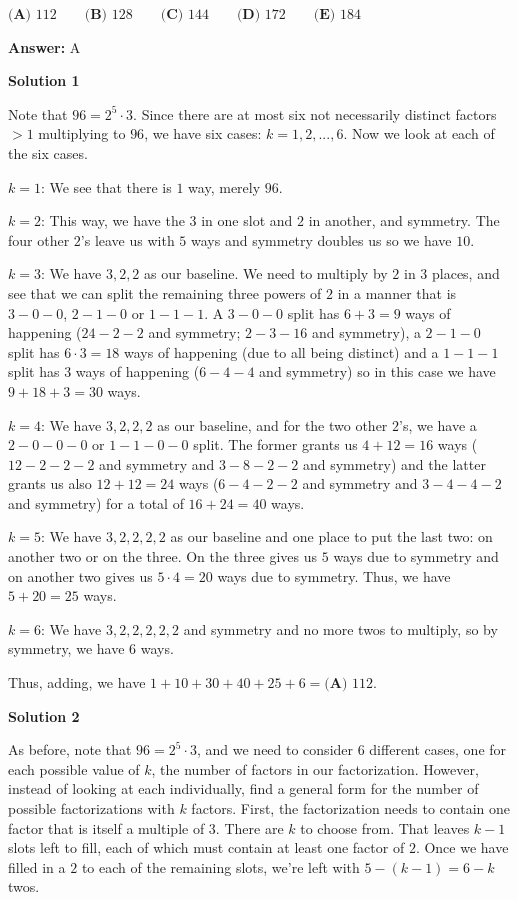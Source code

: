 \begin{enumerate}
 $\textbf{(A) } 112 \qquad\textbf{(B) } 128 \qquad\textbf{(C) } 144 \qquad\textbf{(D) } 172 \qquad\textbf{(E) } 184$

 \textbf{Answer: }A



\textbf{Solution 1}

Note that $96 = 2^5 \cdot 3$. Since there are at most six not necessarily distinct factors $>1$ multiplying to $96$, we have six cases: $k=1, 2, ..., 6.$ Now we look at each of the six cases.

 
$k=1$: We see that there is $1$ way, merely $96$.

 $k=2$: This way, we have the $3$ in one slot and $2$ in another, and symmetry. The four other $2$'s leave us with $5$ ways and symmetry doubles us so we have $10$.

 $k=3$: We have $3, 2, 2$ as our baseline. We need to multiply by $2$ in $3$ places, and see that we can split the remaining three powers of $2$ in a manner that is $3-0-0$, $2-1-0$ or $1-1-1$. A $3-0-0$ split has $6 + 3 = 9$ ways of happening ($24-2-2$ and symmetry; $2-3-16$ and symmetry), a $2-1-0$ split has $6 \cdot 3 = 18$ ways of happening (due to all being distinct) and a $1-1-1$ split has $3$ ways of happening ($6-4-4$ and symmetry) so in this case we have $9+18+3=30$ ways.

 $k=4$: We have $3, 2, 2, 2$ as our baseline, and for the two other $2$'s, we have a $2-0-0-0$ or $1-1-0-0$ split. The former grants us $4+12=16$ ways ($12-2-2-2$ and symmetry and $3-8-2-2$ and symmetry) and the latter grants us also $12+12=24$ ways ($6-4-2-2$ and symmetry and $3-4-4-2$ and symmetry) for a total of $16+24=40$ ways.

 $k=5$: We have $3, 2, 2, 2, 2$ as our baseline and one place to put the last two: on another two or on the three. On the three gives us $5$ ways due to symmetry and on another two gives us $5 \cdot 4 = 20$ ways due to symmetry. Thus, we have $5+20=25$ ways.

 $k=6$: We have $3, 2, 2, 2, 2, 2$ and symmetry and no more twos to multiply, so by symmetry, we have $6$ ways.

 
Thus, adding, we have $1+10+30+40+25+6=\boxed{\textbf{(A) } 112}$.

 



\textbf{Solution 2}

As before, note that $96=2^5\cdot3$, and we need to consider 6 different cases, one for each possible value of $k$, the number of factors in our factorization. However, instead of looking at each individually, find a general form for the number of possible factorizations with $k$ factors. First, the factorization needs to contain one factor that is itself a multiple of $3$. There are $k$ to choose from. That leaves $k-1$ slots left to fill, each of which must contain at least one factor of $2$. Once we have filled in a $2$ to each of the remaining slots, we're left with $5-(k-1)=6-k$ twos. 


\end{enumerate}
